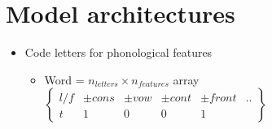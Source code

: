 \documentclass[a4paper, 10pt]{article}
\begin{document}
\section{Model architectures}
\begin{itemize}
    \item Code letters for phonological features
    \begin{itemize}
        \item Word = $n_{letters} \times n_{features}$ array
        \newline
        \newline
        $\begin{Bmatrix}
        l/f & \pm cons & \pm vow & \pm cont & \pm front & .. \\
        t & 1 & 0 & 0 & 1
        \end{Bmatrix}$
    \end{itemize}
\end{itemize}


\end{document}
